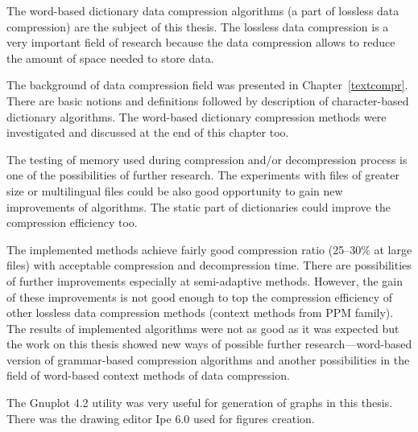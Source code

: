 \documentclass[thesis=M,english]{FITthesis}[2012/10/20]
\begin{document}
\begin{conclusion}
	The word-based dictionary data compression algorithms (a part of lossless data compression) are the subject of this thesis. The lossless data compression is a very important field of research because the data compression allows to reduce the amount of space needed to store data.

	The background of data compression field was presented in Chapter~\ref{textcompr}. There are basic notions and definitions followed by description of character-based dictionary algorithms. The word-based dictionary compression methods were investigated and discussed at the end of this chapter too.


	The testing of memory used during compression and/or decompression process is one of the possibilities of further research. The experiments with files of greater size or multilingual files could be also good opportunity to gain new improvements of algorithms. The static part of dictionaries could improve the compression efficiency too.

	The implemented methods achieve fairly good compression ratio (25--30$\%$ at large files) with acceptable compression and decompression time. There are possibilities of further improvements especially at semi-adaptive methods. However, the gain of these improvements is not good enough to top the compression efficiency of other lossless data compression methods (context methods from PPM family). The results of implemented algorithms were not as good as it was expected but the work on this thesis showed new ways of possible further research---word-based version of grammar-based compression algorithms and another possibilities in the field of word-based context methods of data compression.

	The Gnuplot 4.2 utility was very useful for generation of graphs in this thesis. There was the drawing editor Ipe 6.0 used for figures creation.
	\nocite{Po01}
\end{conclusion}
\end{document}
